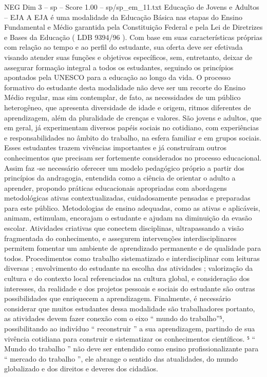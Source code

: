 \begin{textsample}{NEG Dim 3 – sp – Score 1.00 – sp/sp\_em\_11.txt}  \label{ex:f3_neg_090}
Educação de Jovens e Adultos – EJA A EJA é uma modalidade da Educação Básica nas etapas do Ensino Fundamental e Médio garantida pela Constituição Federal e pela Lei de Diretrizes e Bases da Educação ( LDB 9394/96 ).
Com base em suas características próprias com relação ao tempo e ao perfil do estudante, sua oferta deve ser efetivada visando atender suas funções e objetivos específicos, sem, entretanto, deixar de assegurar formação integral a todos os estudantes, seguindo os princípios apontados pela UNESCO para a educação ao longo da vida.
O processo formativo do estudante desta modalidade não deve ser um recorte do Ensino Médio regular, mas sim contemplar, de fato, as necessidades de um público heterogêneo, que apresenta diversidade de idade e origem, ritmos diferentes de aprendizagem, além da pluralidade de crenças e valores.
São jovens e adultos, que em geral, já experimentam diversos papéis sociais no cotidiano, com experiências e responsabilidades no âmbito do trabalho, na esfera familiar e em grupos sociais.
Esses estudantes trazem vivências importantes e já construíram outros conhecimentos que precisam ser fortemente considerados no processo educacional.
Assim faz -se necessário oferecer um modelo pedagógico próprio a partir dos princípios da andragogia, entendida como a ciência de orientar o adulto a aprender, propondo práticas educacionais apropriadas com abordagens metodológicas ativas contextualizadas, cuidadosamente pensadas e preparadas para este público.
Metodologias de ensino adequadas, como as ativas e aplicáveis, animam, estimulam, encorajam o estudante e ajudam na diminuição da evasão escolar.
Atividades criativas que conectem disciplinas, ultrapassando a visão fragmentada do conhecimento, e assegurem intervenções interdisciplinares permitem fomentar um ambiente de aprendizado permanente e de qualidade para todos.
Procedimentos como trabalho sistematizado e interdisciplinar com leituras diversas ; envolvimento do estudante na escolha das atividades ; valorização da cultura e do contexto local referenciados na cultura global, e consideração dos interesses, da realidade e dos projetos pessoais e sociais do estudante são outras possibilidades que enriquecem a aprendizagem.
Finalmente, é necessário considerar que muitos estudantes dessa modalidade são trabalhadores portanto, as atividades devem fazer conexão com o eixo “ mundo do trabalho”⁵, possibilitando ao indivíduo “ reconstruir ” a sua aprendizagem, partindo de sua vivência cotidiana para construir e sistematizar os conhecimentos científicos. ⁵ “ Mundo do trabalho ” não deve ser entendido como ensino profissionalizante para “ mercado do trabalho ”, ele abrange o sentido das atualidades, do mundo globalizado e dos direitos e deveres dos cidadãos.

\end{textsample}

